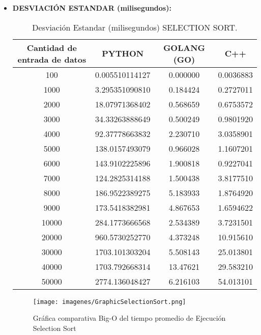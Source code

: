 \documentclass{article}
\begin{document}
\begin{itemize}
      \item \textbf{DESVIACIÓN ESTANDAR (milisegundos):}
        \begin{table}[H]
            \centering
            \begin{tabular}{||c c c c||} 
              \hline
              \textbf{Cantidad de entrada de datos} & \textbf{PYTHON} & \textbf{GOLANG (GO)} & \textbf{C++} \\ [0.5ex] 
              \hline\hline
              100    &  0.005510114127  &  0.000000  &  0.0036883  \\ [0.5ex]
              1000   &  3.295351090810  &  0.184424  &  0.2727011  \\ [0.5ex]
              2000   &  18.07971368402  &  0.568659  &  0.6753572  \\ [0.5ex]
              3000   &  34.33263888649  &  0.500249  &  0.9801920  \\ [0.5ex]
              4000   &  92.37778663832  &  2.230710  &  3.0358901  \\ [0.5ex]
              5000   &  138.0157493079  &  0.966028  &  1.1607201  \\ [0.5ex]
              6000   &  143.9102225896  &  1.900818  &  0.9227041  \\ [0.5ex]
              7000   &  124.2825314188  &  1.500438  &  3.8177510  \\ [0.5ex]
              8000   &  186.9522389275  &  5.183933  &  1.8764920  \\ [0.5ex]
              9000   &  173.5418382981  &  4.867653  &  1.6594622  \\ [0.5ex]
              10000  &  284.1773666568  &  2.534389  &  3.7231501  \\ [0.5ex]
              20000  &  960.5730252770  &  4.373248  &  10.915610  \\ [0.5ex]
              30000  &  1703.101303204  &  5.508143  &  25.013801  \\ [0.5ex]
              40000  &  1703.792668314  &  13.47621  &  29.583210  \\ [0.5ex]
              50000  &  2774.136048427  &  6.216103  &  54.013101  \\ [0.5ex]
              \hline
            \end{tabular}
            \caption{Desviación Estandar (milisegundos) SELECTION SORT.}
            \label{table:desviacionEstandarSelectionSort}
        \end{table}

        \begin{figure}[H]
        \centering
        \texttt{[image: imagenes/GraphicSelectionSort.png]}
        \caption{\label{fig:bigOSelectionSort}Gráfica comparativa Big-O del tiempo promedio de Ejecución Selection Sort}
        \end{figure}
    \end{itemize}
\end{document}
